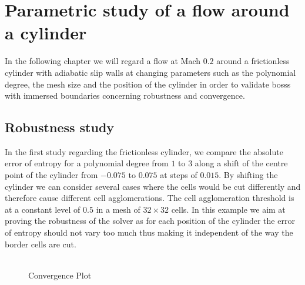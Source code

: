 \chapter{Parametric study of a flow around a cylinder}
	\label{eulerVerification}
	In the following chapter we will regard a flow at Mach $0.2$ around a frictionless cylinder with adiabatic slip walls at changing parameters such as the polynomial degree, the mesh size and the position of the cylinder in order to validate \gls{bosss} with immersed boundaries concerning robustness and convergence.

	\section{Robustness study}
	In the first study regarding the frictionless cylinder, we compare the absolute error of entropy for a polynomial degree from $1$ to $3$ along a shift of the centre point of the cylinder from $-0.075$ to $0.075$ at steps of $0.015$. By shifting the cylinder we can consider several cases where the cells would be cut differently and therefore cause different cell agglomerations. The cell agglomeration threshold is at a constant level of $0.5$ in a mesh of $32 \times 32$ cells. In this example we aim at proving the robustness of the solver as for each position of the cylinder the error of entropy should not vary too much thus making it independent of the way the border cells are cut. \\ \\

	\begin{figure}[htp]	
		\centering
		\label{shifterror}	
		\caption{Convergence Plot}
	\end{figure}
	

